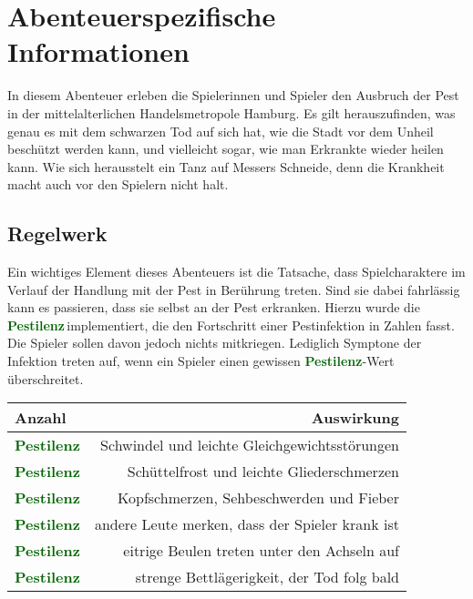 
\section*{Abenteuerspezifische Informationen}

In diesem Abenteuer erleben die Spielerinnen und Spieler den Ausbruch der Pest in der
mittelalterlichen Handelsmetropole Hamburg. Es gilt herauszufinden, was genau es mit
dem schwarzen Tod auf sich hat, wie die Stadt vor dem Unheil beschützt werden kann,
und vielleicht sogar, wie man Erkrankte wieder heilen kann. Wie sich herausstelt ein
Tanz auf Messers Schneide, denn die Krankheit macht auch vor den Spielern nicht halt.

\subsection*{Regelwerk}
\label{ssec:rules}

\newcommand{\Pestilenz}[1][]{\textbf{\textcolor{darkgreen}{Pestilenz\ifthenelse{\equal{#1}{}}{}{$\;#1$}}}}

Ein wichtiges Element dieses Abenteuers ist die Tatsache, dass Spielcharaktere im
Verlauf der Handlung mit der Pest in Berührung treten. Sind sie dabei fahrlässig
kann es passieren, dass sie selbst an der Pest erkranken. Hierzu wurde die 
\Pestilenz{}$\,$implementiert, die den Fortschritt einer Pestinfektion in Zahlen 
fasst. Die Spieler sollen davon jedoch nichts mitkriegen. Lediglich Symptone der 
Infektion treten auf, wenn ein Spieler einen gewissen \Pestilenz{}-Wert 
überschreitet.

\begin{center}
\begingroup
\renewcommand{\arraystretch}{1.4}
  \begin{tabular*}{0.8\textwidth}{@{\extracolsep{\fill}} lr}
    \toprule
    Anzahl & Auswirkung \\
    \midrule
    \Pestilenz[1-2] & Schwindel und leichte Gleichgewichtsstörungen \\
    \Pestilenz[3-4] & Schüttelfrost und leichte Gliederschmerzen \\
    \Pestilenz[5-6] & Kopfschmerzen, Sehbeschwerden und Fieber \\
    \Pestilenz[7-8] & andere Leute merken, dass der Spieler krank ist \\
    \Pestilenz[9-10] & eitrige Beulen treten unter den Achseln auf \\
    \Pestilenz[>10] & strenge Bettlägerigkeit, der Tod folg bald \\
    \bottomrule
  \end{tabular*}
\endgroup
\end{center}

